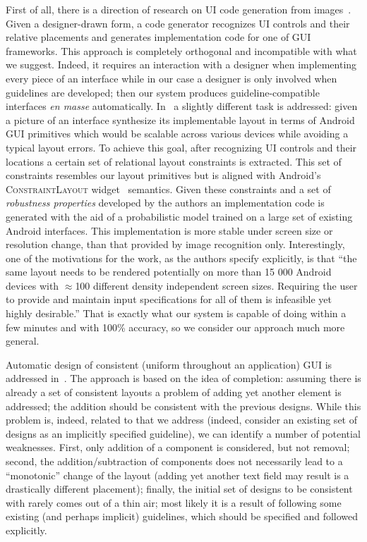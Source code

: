 First of all, there is a direction of research on UI code generation from images~\cite{Cai2023}. Given a designer-drawn form, a code
generator recognizes UI controls and their relative placements and generates implementation code for one of GUI frameworks. This approach
is completely orthogonal and incompatible with what we suggest. Indeed, it requires an interaction with a designer when implementing every piece of
an interface while in our case a designer is only involved when guidelines are developed; then our system produces guideline-compatible
interfaces \emph{en masse} automatically. In~\cite{Robust} a slightly different task is addressed: given a picture of an interface synthesize its
implementable layout in terms of Android GUI primitives which would be scalable across various devices while avoiding a typical layout errors.
To achieve this goal, after recognizing UI controls and their locations a certain set of relational layout constraints is extracted. This
set of constraints resembles our layout primitives but is aligned with Android's \textsc{ConstraintLayout} widget~\cite{ConstraintLayout} semantics.
Given these constraints and a set of \emph{robustness properties} developed by the authors an implementation code is generated with
the aid of a probabilistic model trained on a large set of existing Android interfaces. This implementation is more stable under screen size
or resolution change, than that provided by image recognition only. Interestingly, one of the motivations for the work, as the authors
specify explicitly, is that ``the same layout needs to be rendered potentially on more than 15 000 Android devices with $\approx$100 different density
independent screen sizes. Requiring the user to provide and maintain input specifications for all of them is infeasible yet highly desirable.''
That is exactly what our system is capable of doing within a few minutes and with 100\% accuracy, so we consider our approach
much more general.

Automatic design of consistent (uniform throughout an application) GUI is addressed in~\cite{LearningGUI}. The approach is based on the idea of completion:
assuming there is already a set of consistent layouts a problem of adding yet another element is addressed; the addition should be consistent with the previous
designs. While this problem is, indeed, related to that we address (indeed, consider an existing set of designs as an implicitly specified guideline),
we can identify a number of potential weaknesses. First, only addition of a component is considered, but not removal; second, the addition/subtraction
of components does not necessarily lead to a ``monotonic'' change of the layout (adding yet another text field may result is a drastically different placement);
finally, the initial set of designs to be consistent with rarely comes out of a thin air; most likely it is a result of following some
existing (and perhaps implicit) guidelines, which should be specified and followed explicitly.

